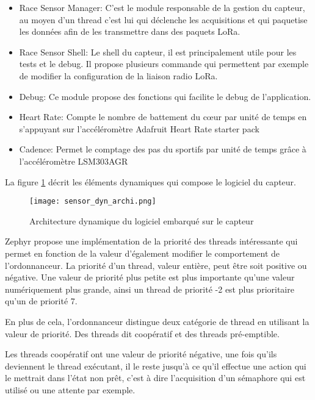 \begin{itemize}
\item Race Sensor Manager: C'est le module responsable de la gestion du capteur, au moyen d'un thread c'est lui qui déclenche les acquisitions et qui paquetise les données afin de les transmettre dans des paquets LoRa.
\item Race Sensor Shell: Le shell du capteur, il est principalement utile pour les tests et le debug. Il propose plusieurs commande qui permettent par exemple de modifier la configuration de la liaison radio LoRa.
\item Debug: Ce module propose des fonctions qui facilite le debug de l'application.
\item Heart Rate: Compte le nombre de battement du cœur par unité de temps en s'appuyant sur l'accéléromètre Adafruit Heart Rate starter pack
\item Cadence: Permet le comptage des pas du sportifs par unité de temps grâce à l'accéléromètre LSM303AGR
\end{itemize}

La figure \ref{fig:sensor_dyn_archi} décrit les éléments dynamiques qui compose le logiciel du capteur.


\begin{figure}[htb]
\centering 
\texttt{[image: sensor\_dyn\_archi.png]} 
\caption{Architecture dynamique du logiciel embarqué sur le capteur}
\label{fig:sensor_dyn_archi}
\end{figure}

Zephyr propose une implémentation de la priorité des threads intéressante qui permet en fonction de la valeur d'également modifier le comportement de l'ordonnanceur. La priorité d'un thread, valeur entière, peut être soit positive ou négative. Une valeur de priorité plus petite est plus importante qu'une valeur numériquement plus grande, ainsi un thread de priorité -2 est plus prioritaire qu'un de priorité 7.

En plus de cela, l'ordonnanceur distingue deux catégorie de thread en utilisant la valeur de priorité. Des threads dit coopératif et des threads pré-emptible.

Les threads coopératif ont une valeur de priorité négative, une fois qu'ils deviennent le thread exécutant, il le reste jusqu'à ce qu'il effectue une action qui le mettrait dans l'état non prêt, c'est à dire l'acquisition d'un sémaphore qui est utilisé ou une attente par exemple.

